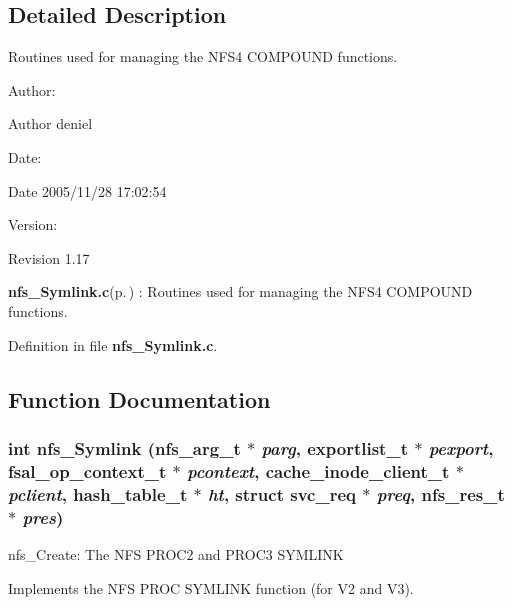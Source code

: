 \subsection{Detailed Description}
Routines used for managing the NFS4 COMPOUND functions. 

\begin{Desc}
\item[Author:]\begin{Desc}
\item[Author]deniel \end{Desc}
\end{Desc}
\begin{Desc}
\item[Date:]\begin{Desc}
\item[Date]2005/11/28 17:02:54 \end{Desc}
\end{Desc}
\begin{Desc}
\item[Version:]\begin{Desc}
\item[Revision]1.17 \end{Desc}
\end{Desc}
{\bf nfs\_\-Symlink.c}{\rm (p.\,\pageref{nfs__Symlink_8c})} : Routines used for managing the NFS4 COMPOUND functions.

Definition in file {\bf nfs\_\-Symlink.c}.

\subsection{Function Documentation}
\subsubsection{\setlength{\rightskip}{0pt plus 5cm}int nfs\_\-Symlink (nfs\_\-arg\_\-t $\ast$ {\em parg}, exportlist\_\-t $\ast$ {\em pexport}, fsal\_\-op\_\-context\_\-t $\ast$ {\em pcontext}, cache\_\-inode\_\-client\_\-t $\ast$ {\em pclient}, hash\_\-table\_\-t $\ast$ {\em ht}, struct svc\_\-req $\ast$ {\em preq}, nfs\_\-res\_\-t $\ast$ {\em pres})}\label{nfs__Symlink_8c_a0}


nfs\_\-Create: The NFS PROC2 and PROC3 SYMLINK

Implements the NFS PROC SYMLINK function (for V2 and V3).

